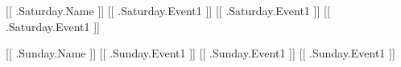 \vspace{-.5em}
              {\color{Maroon} [[ .Saturday.Name ]]}
              {[[ .Saturday.Event1 ]]}
              {[[ .Saturday.Event1 ]]}
              {[[ .Saturday.Event1 ]]}

\vspace{-.5em}
              {\color{Maroon} [[ .Sunday.Name ]]}
              {[[ .Sunday.Event1 ]]}
              {[[ .Sunday.Event1 ]]}
              {[[ .Sunday.Event1 ]]}

